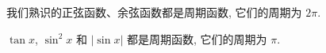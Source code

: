 \documentclass[10pt,UTF8]{book} %
\begin{document}
\begin{example}
    我们熟识的正弦函数、余弦函数都是周期函数, 它们的周期为 $2\pi$.
\end{example}

\begin{example}
    $\tan x$, $\sin^2 x$ 和 $\left| \sin x \right|$ 
    都是周期函数, 它们的周期为 $\pi$.
\end{example}
\end{document}
